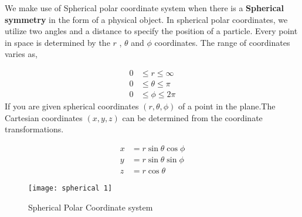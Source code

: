 		We make  use of Spherical polar coordinate system when there is a \textbf{Spherical symmetry} in the form of a physical object. 
		In spherical polar coordinates, we utilize two angles and a distance to specify the position of a particle. Every point in space is determined by
		the $r$ , $\theta$  and $\phi $ coordinates.
		The range of coordinates varies as, \\
		\begin{minipage}{0.45\textwidth}
			\begin{align*}
			0 &\leq r \leq \infty\\
			0 &\leq \theta \leq \pi\\
			0&\leq \phi \leq 2\pi
			\end{align*}
			If you are given spherical coordinates $(r, \theta, \phi)$ of a point in the plane.The Cartesian coordinates $(x, y, z)$ can be determined from the coordinate transformations.
			
			\begin{align*}
			x&=r \sin \theta \cos \phi \\
			y&=r \sin \theta \sin \phi \\
			z&=r \cos \theta
			\end{align*}
		\end{minipage}
	\begin{minipage}{0.45\textwidth}
	\begin{figure}[H]
		\centering
	\texttt{[image: spherical 1]}
		\caption{Spherical Polar Coordinate system}
		\label{Spherical Polar Coordinate system}
	\end{figure}
	\end{minipage}
		
	
